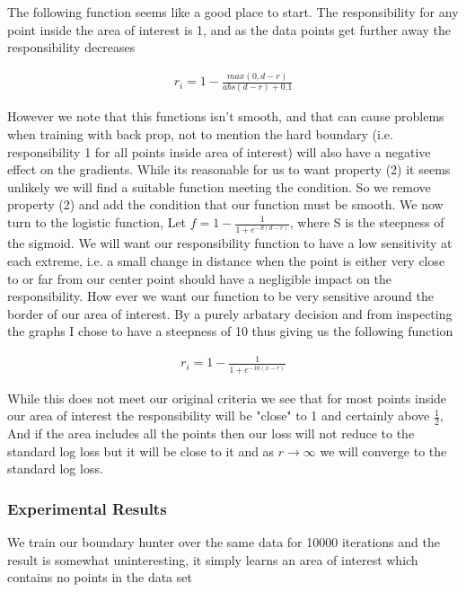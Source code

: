 \documentclass{article}
\begin{document}
The following function seems like a good place to start. The responsibility for any point inside the area of interest is 1, and as the data points get further away the responsibility decreases

\begin{align}
r_i = 1 - \frac{max(0, d-r)}{abs(d-r) + 0.1}
\end{align}

However we note that this functions isn't smooth, and that can cause problems when training with back prop, not to mention the hard boundary (i.e. responsibility 1 for all points inside area of interest) will also have a negative effect on the gradients. While its reasonable for us to want property (2) it seems unlikely we will find a suitable function meeting the condition. So we remove property (2) and add the condition that our function must be smooth. We now turn to the logistic function, Let $f = 1 - \frac{1}{1 + e^{-S(d - r)}}$, where S is the steepness of the sigmoid. We will want our responsibility function to have a low sensitivity at each extreme, i.e. a small change in distance when the point is either very close to or far from our center point should have a negligible impact on the responsibility. How ever we want our function to be very sensitive around the border of our area of interest. By a purely arbatary decision and from inspecting the graphs I chose to have a steepness of 10 thus giving us the following function

\begin{align}
r_i = 1 - \frac{1}{1 + e^{-10(x-r)}}
\end{align}

While this does not meet our original criteria we see that for most points inside our area of interest the responsibility will be "close" to 1 and certainly above $\frac{1}{2}$, And if the area includes all the points then our loss will not reduce to the standard log loss but it will be close to it and as $r \to\infty$ we will converge to the standard log loss.

\subsubsection{Experimental Results}
We train our boundary hunter over the same data for 10000 iterations and the result is somewhat uninteresting, it simply learns an area of interest which contains no points in the data set
\end{document}

